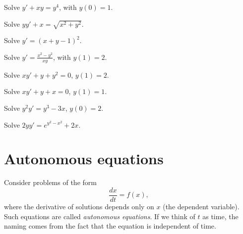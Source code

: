 \begin{exercise}
Solve $y' + xy = y^4$, with $y(0)=1$.
\end{exercise}

\begin{exercise}
Solve $yy' + x = \sqrt{x^2 + y^2}$.
\end{exercise}

\begin{exercise}
Solve $y' = {(x+y-1)}^2$.
\end{exercise}

\begin{exercise}
Solve $y' = \frac{x^2-y^2}{x y}$, with $y(1) = 2$.
\end{exercise}

\setcounter{exercise}{100}

\begin{exercise}
Solve $xy'+y+y^2 = 0$, $y(1)=2$.
\end{exercise}

\begin{exercise}
Solve $xy'+y +x = 0$, $y(1)=1$.
\end{exercise}

\begin{exercise}
Solve $y^2y' = y^3-3x$, $y(0)=2$.
\end{exercise}

\begin{exercise}
Solve $2yy' = e^{y^2-x^2} + 2x$.
\end{exercise}


\sectionnewpage
\section{Autonomous equations}
\label{auteq:section}


Consider
problems of the form
\begin{equation*}
\frac{dx}{dt} = f(x) ,
\end{equation*}
where the derivative of solutions depends only on $x$ (the dependent
variable).  Such equations are called \emph{autonomous
equations}.  If we think
of $t$ as time, the naming comes from the fact that the equation is
independent of time.

